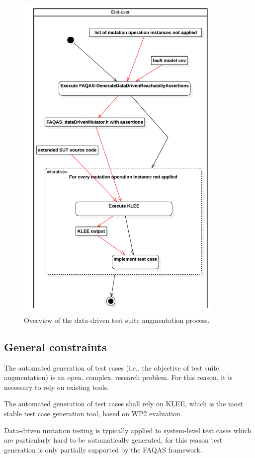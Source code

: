 \begin{figure}[h]
  \centering
	\includegraphics[width=10cm]{images/png/Activity1!DataDrivenTestSuiteAugmentation_4.png}
      \caption{Overview of the data-driven test suite augmentation process.}
      \label{fig:process:dataDriven:augment}
\end{figure}



\clearpage
\subsection{General constraints}

\RQ{} The automated generation of test cases (i.e., the objective of test suite augmentation) is an open, complex, research problem. For this reason, it is necessary to rely on existing tools.

\RQ{} The automated generation of test cases shall rely on KLEE, which is the most stable test case generation tool, based on WP2 evaluation.

\RQ{} Data-driven mutation testing is typically applied to system-level test cases which are particularly hard to be automatically generated, for this reason test generation is only partially supported by the FAQAS framework.



